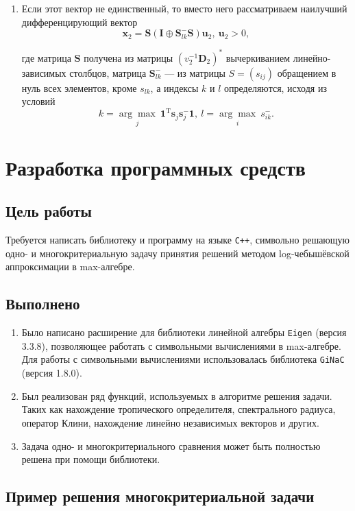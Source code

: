 \documentclass[specialist,
	substylefile = spbu.rtx,
	subf,href,colorlinks=true, 12pt]{disser}
\begin{document}
\begin{enumerate}
	\item Если этот вектор не единственный, то вместо него рассматриваем наилучший дифференцирующий вектор
	      \[
		      \mathbf{x}_2 =\mathbf{S}(\mathbf{I}\oplus\mathbf{S}^-_{lk}\mathbf{S})\mathbf{u}_2,~ \mathbf{u}_2 > 0,
	      \]

	      где матрица $\mathbf{S}$ получена из матрицы $(v^{-1}_2\mathbf{D}_2)^*$ вычеркиванием линейно-зависимых столбцов, матрица $\mathbf{S}^-_{lk}$ --- из матрицы $S = (s_{ij})$ обращением
	      в нуль всех элементов, кроме $s_{lk}$, а индексы $k$ и $l$ определяются, исходя из условий
	      \[
		      k = \underset{j}{\arg\max}~\mathbf{1}^\mathrm{T}\mathbf{s}_j\mathbf{s}^-_j\mathbf{1},~l = \underset{i}{\arg\max} ~s^-_{ik}.
	      \]
\end{enumerate}

\chapter{Разработка программных средств}
\section{Цель работы}
Требуется написать библиотеку и программу на языке \texttt{C++}, символьно решающую одно- и многокритериальную задачу принятия решений методом log-чебышёвской аппроксимации в max-алгебре.
\section{Выполнено}
\begin{enumerate}
	\item Было написано расширение для библиотеки линейной алгебры \texttt{Eigen} \cite{eigenweb} (версия 3.3.8), позволяющее работать с символьными вычислениями в max-алгебре.
	Для работы с символьными вычислениями использовалась библиотека \texttt{GiNaC} \cite{ginac_2006} (версия 1.8.0).
	\item Был реализован ряд функций, используемых в алгоритме решения задачи. Таких как
        нахождение тропического определителя, спектрального радиуса, оператор Клини, нахождение линейно независимых векторов и других.
	\item Задача одно- и многокритериального сравнения может быть полностью решена при помощи библиотеки.
\end{enumerate}

\section{Пример решения многокритериальной задачи}
\end{document}
